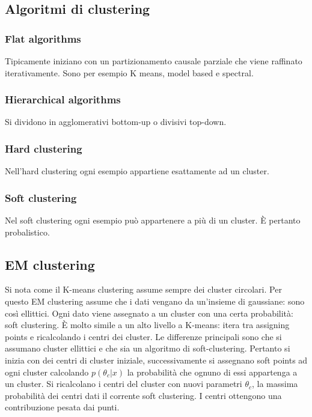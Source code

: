 	\subsection{Algoritmi di clustering}

		\subsubsection{Flat algorithms}
		Tipicamente iniziano con un partizionamento causale parziale che viene raffinato iterativamente.
		Sono per esempio K means, model based e spectral.

		\subsubsection{Hierarchical algorithms}
		Si dividono in agglomerativi bottom-up o divisivi top-down.

		\subsubsection{Hard clustering}
		Nell'hard clustering ogni esempio appartiene esattamente ad un cluster.

		\subsubsection{Soft clustering}
		Nel soft clustering ogni esempio pu\`o appartenere a pi\`u di un cluster.
		\`E pertanto probalistico.

	\subsection{EM clustering}
	Si nota come il K-means clustering assume sempre dei cluster circolari.
	Per questo EM clustering assume che i dati vengano da un'insieme di gaussiane: sono cos\`i ellittici.
	Ogni dato viene assegnato a un cluster con una certa probabilit\`a: soft clustering.
	\`E molto simile a un alto livello a K-means: itera tra assigning points e ricalcolando i centri dei cluster.
	Le differenze principali sono che si assumano cluster ellittici e che sia un algoritmo di soft-clustering.
	Pertanto si inizia con dei centri di cluster iniziale, successivamente si assegnano soft points ad ogni cluster calcolando $p(\theta_c|x)$ la probabilit\`a che ognuno di essi appartenga a un cluster.
	Si ricalcolano i centri del cluster con nuovi parametri $\theta_c$, la massima probabilit\`a dei centri dati il corrente soft clustering.
	I centri ottengono una contribuzione pesata dai punti.

